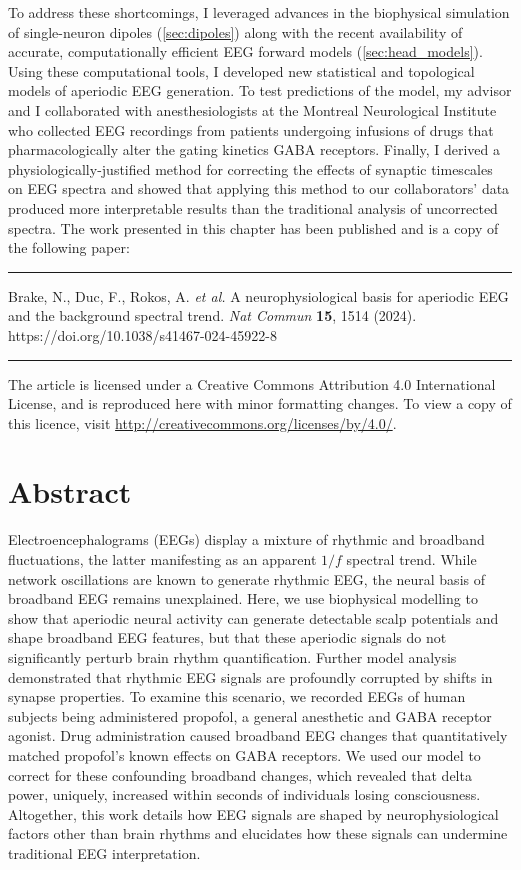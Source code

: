 To address these shortcomings, I leveraged advances in the biophysical simulation of single-neuron dipoles (\autoref{sec:dipoles}) along with the recent availability of accurate, computationally efficient EEG forward models (\autoref{sec:head_models}). Using these computational tools, I developed new statistical and topological models of aperiodic EEG generation. To test predictions of the model, my advisor and I collaborated with anesthesiologists at the Montreal Neurological Institute who collected EEG recordings from patients undergoing infusions of drugs that pharmacologically alter the gating kinetics GABA receptors. Finally, I derived a physiologically-justified method for correcting the effects of synaptic timescales on EEG spectra and showed that applying this method to our collaborators' data produced more interpretable results than the traditional analysis of uncorrected spectra. The work presented in this chapter has been published and is a copy of the following paper:

\vspace{1em}
\hrule
\vspace{.5em}
\noindent
\hangindent=1cm
Brake, N., Duc, F., Rokos, A. \textit{et al.} A neurophysiological basis for aperiodic EEG and the background spectral trend. \textit{Nat Commun} \textbf{15}, 1514 (2024). https://doi.org/10.1038/s41467-024-45922-8
\vspace{.75em}
\hrule
\vspace{.65em}

\noindent
The article is licensed under a Creative Commons Attribution 4.0 International License, and is reproduced here with minor formatting changes. To view a copy of this licence, visit \url{http://creativecommons.org/licenses/by/4.0/}.


\newpage

\section{Abstract}
Electroencephalograms (EEGs) display a mixture of rhythmic and broadband fluctuations, the latter manifesting as an apparent $1/f$ spectral trend. While network oscillations are known to generate rhythmic EEG, the neural basis of broadband EEG remains unexplained. Here, we use biophysical modelling to show that aperiodic neural activity can generate detectable scalp potentials and shape broadband EEG features, but that these aperiodic signals do not significantly perturb brain rhythm quantification. Further model analysis demonstrated that rhythmic EEG signals are profoundly corrupted by shifts in synapse properties. To examine this scenario, we recorded EEGs of human subjects being administered propofol, a general anesthetic and GABA receptor agonist. Drug administration caused broadband EEG changes that quantitatively matched propofol’s known effects on GABA receptors. We used our model to correct for these confounding broadband changes, which revealed that delta power, uniquely, increased within seconds of individuals losing consciousness. Altogether, this work details how EEG signals are shaped by neurophysiological factors other than brain rhythms and elucidates how these signals can undermine traditional EEG interpretation.


